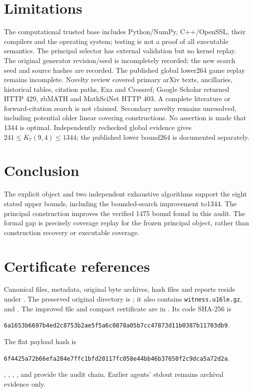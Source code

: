 \documentclass[11pt]{article}
\begin{document}
\section{Limitations}
The computational trusted base includes Python/NumPy, C++/OpenSSL, their compilers
and the operating system; testing is not a proof of all executable semantics.
The principal selector has external validation but no kernel replay. The original generator
revision/seed is incompletely recorded; the new search seed and source hashes
are recorded. The published global lower264 game replay remains incomplete. Novelty review covered primary arXiv texts,
ancillaries, historical tables, citation paths, Exa and Crossref; Google Scholar
returned HTTP 429, zbMATH and MathSciNet HTTP 403. A complete literature or
forward-citation search is not claimed. Secondary novelty remains unresolved,
including potential older linear covering constructions. No assertion is made
that 1344 is optimal. Independently rechecked global evidence gives
$241\le K_7(9,4)\le1344$; the published lower bound264 is documented separately.

\section{Conclusion}
The explicit object and two independent exhaustive algorithms support the eight
stated upper bounds, including the bounded-search improvement to1344.
The principal construction improves the verified 1475 bound
found in this audit. The formal gap is precisely coverage replay for the frozen
principal object, rather than construction recovery or executable coverage.

\appendix
\section{Certificate references}
Canonical files, metadata, original byte archives, hash files and reports reside
under . The preserved original directory is
; it also contains \texttt{witness.u16le.gz},
 and .
The improved file and compact certificate are in .
Its code SHA-256 is
\begin{center}\small
\texttt{6a1653b6697b4ed2c8753b2ae5f5a6c0878a05b7cc47873d11b0387b11703db9}.
\end{center}
The flat payload hash is
\begin{center}\small
\texttt{6f4425a72b66efa284e7ffc1bfd20117fc058e44bb46b37650f2c9dca5a72d2a}.
\end{center}
, ,
, ,
 and  provide the audit
chain. Earlier agents' stdout remains archival evidence only.
\end{document}
